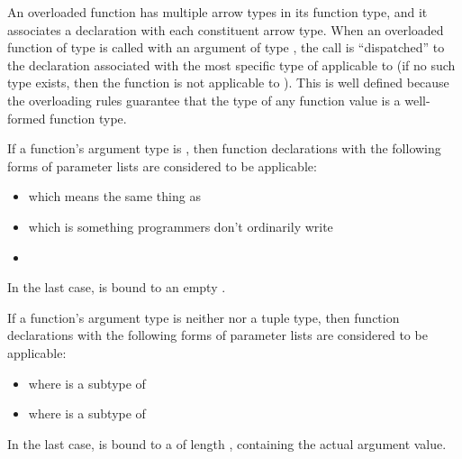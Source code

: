 An overloaded function has multiple arrow types in its function type,
and it associates a declaration with each constituent arrow type.
When an overloaded function of type  is called with an argument of type
, the call is ``dispatched'' to the declaration associated with
the most specific type of  applicable to 
(if no such type exists, then the function is not applicable to ).
This is well defined because the overloading rules guarantee that
the type of any function value is a well-formed function type.

If a function's argument type is \EXP{()},
then function declarations with the following forms of parameter lists are
considered to be applicable:
\begin{itemize}
\item   \EXP{()}
which means the same thing as \EXP{(\_\COLONOP())}
\item   {}
which is something programmers don't ordinarily write
\item   {}
\end{itemize}
In the last case,  is bound to an empty
.

If a function's argument type  is
    neither \EXP{()} nor a tuple type, then function declarations with the following forms of parameter lists are considered
    to be applicable:
\begin{itemize}
\item
               where  is a subtype of 
\item
         where  is a subtype of 
\end{itemize}
In the last case,  is bound to a
     of length ,
    containing  the actual argument value.

